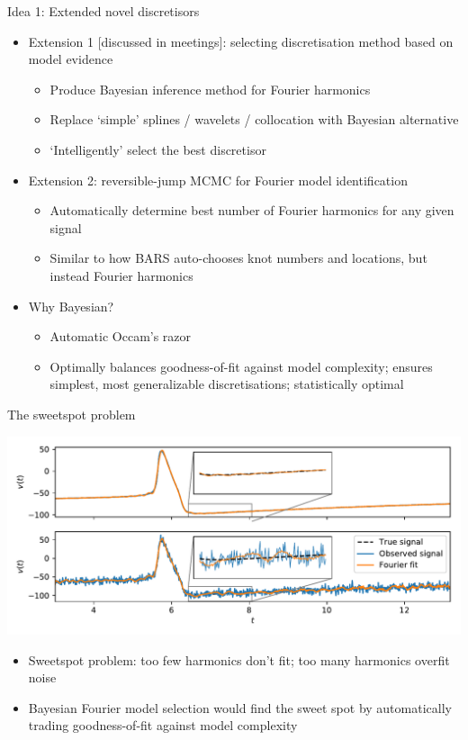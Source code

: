 \documentclass[presentation]{beamer}
\begin{document}
\begin{frame}[<+->][label={sec:org0161f49},plain]{Idea 1: Extended novel discretisors}
\begin{itemize}
\item Extension 1 [discussed in meetings]: selecting discretisation method based on model evidence
\begin{itemize}
\item Produce Bayesian inference method for Fourier harmonics
\item Replace `simple' splines / wavelets / collocation with Bayesian alternative
\item `Intelligently' select the best discretisor
\end{itemize}
\end{itemize}
\vfill
\begin{itemize}
\item Extension 2: reversible-jump MCMC for Fourier model identification
\begin{itemize}
\item Automatically determine best number of Fourier harmonics for any given signal
\item Similar to how BARS auto-chooses knot numbers and locations, but instead Fourier harmonics
\end{itemize}
\end{itemize}
\vfill
\begin{itemize}
\item Why Bayesian?
\begin{itemize}
\item Automatic Occam's razor
\item Optimally balances goodness-of-fit against model complexity; ensures simplest, most generalizable discretisations; statistically optimal
\end{itemize}
\end{itemize}
\end{frame}

\begin{frame}[label={sec:orge069ffd},plain]{The sweetspot problem}
\begin{center}
\includegraphics[width=.9\linewidth]{./fourier_demo.pdf}
\end{center}

\begin{itemize}
\item Sweetspot problem: too few harmonics don't fit; too many harmonics overfit noise
\item Bayesian Fourier model selection would find the sweet spot by automatically trading goodness-of-fit against model complexity
\end{itemize}
\end{frame}
\end{document}
